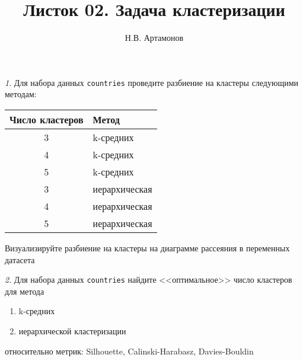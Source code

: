 \documentclass[12pt]{article}
\title{Листок 02. Задача кластеризации}
\author{Н.В. Артамонов}
\theoremstyle{remark}
\newtheorem{exercise}{}[section]
\begin{document}
\maketitle




\begin{exercise}
Для набора данных \texttt{countries} проведите разбиение на кластеры следующими
методам:
\begin{center}
	\begin{tabular}{c|l}
		Число кластеров & Метод \\ \hline
		3 & k-средних \\
		4 & k-средних \\
		5 & k-средних \\
		3 & иерархическая \\
		4 & иерархическая \\
		5 & иерархическая \\ \hline
	\end{tabular}
\end{center}
Визуализируйте разбиение на кластеры на диаграмме рассеяния в переменных датасета
\end{exercise}

\begin{exercise}
Для набора данных \texttt{countries} найдите <<оптимальное>> число кластеров
для метода
\begin{enumerate}
	\item k-средних
	\item иерархической кластеризации
\end{enumerate}
относительно метрик: Silhouette, Calinski-Harabasz, Davies-Bouldin
\end{exercise}
\end{document}
